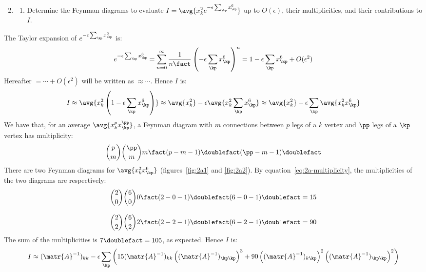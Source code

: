 \begin{enumerate}[leftmargin=0cm]
  \setcounter{enumi}{1}
  \item
        \begin{enumerate}
          \item \label{2a}
                Determine the Feynman diagrams to evaluate $I = \avg{x_k^2 e^{- \epsilon
                        \sum_\kp x_\kp^6 }}$ up to $O(\epsilon)$, their multiplicities, and their
                contributions to $I$.
        \end{enumerate}
\end{enumerate}

The Taylor expansion of $e^{-\epsilon \sum_\kp x_\kp^6}$ is:
\begin{equation*}
  e^{-\epsilon \sum_\kp x_\kp^6}
  = \sum_{n=0}^{\infty} \frac{1}{n\fact} \left( -\epsilon \sum_\kp x_\kp^6 \right)^n
  = 1 - \epsilon \sum_\kp x_\kp^6 + O(\epsilon^2)
\end{equation*}
Hereafter $=\cdots + O(\epsilon^2)$ will be written as $\approx\cdots$.
Hence $I$ is:
\begin{equation*}
  I \approx \avg{x_k^2 \left(1 - \epsilon \sum_\kp x_\kp^6 \right)} \approx
  \avg{x_k^2} - \epsilon \avg{x_k^2 \sum_\kp x_\kp^6} \approx \avg{x_k^2} -
  \epsilon \sum_\kp \avg{x_k^2 x_\kp^6}
\end{equation*}
We have that, for an average $\avg{x_k^p x_\kp^\pp}$, a Feynman diagram with $m$
connections between $p$ legs of a $k$ vertex and $\pp$ legs of a $\kp$ vertex
has multiplicity:
\begin{equation}{}
  \label{eq:2a-multiplicity}
  \binom{p}{m} \binom{\pp}{m} m\fact (p - m - 1)\doublefact (\pp - m - 1)\doublefact
\end{equation}
There are two Feynman diagrams for $\avg{x_k^2 x_\kp^6}$ (figures~\ref{fig:2a1}
and \ref{fig:2a2}).
By equation~\ref{eq:2a-multiplicity}, the multiplicities of the two diagrams are
respectively:
\begin{align*}{}
  \binom{2}{0} \binom{6}{0} 0\fact (2 - 0 - 1)\doublefact (6 - 0 - 1)\doublefact & = 15
  \\[2ex]
  \binom{2}{2} \binom{6}{2} 2\fact (2 - 2 - 1)\doublefact (6 - 2 - 1)\doublefact & = 90
\end{align*}
The sum of the multiplicities is $7\doublefact = 105$, as expected.
Hence $I$ is:
\begin{equation*}
  I \approx
  (\matr{A}^{-1})_{kk} - \epsilon \sum_\kp \left(
  15 (\matr{A}^{-1})_{kk} \left((\matr{A}^{-1})_{\kp\kp}\right)^3 +
  90 \left((\matr{A}^{-1})_{k\kp}\right)^2 \left((\matr{A}^{-1})_{\kp\kp}\right)^2
  \right)
\end{equation*}

